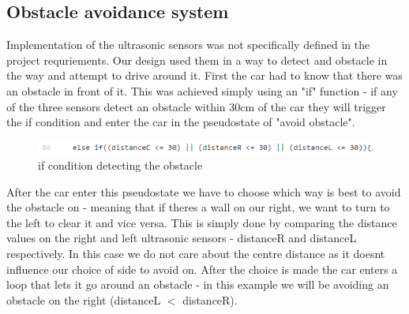 \documentclass[conference]{IEEEtran}
\begin{document}
\subsection{Obstacle avoidance system}
Implementation of the ultrasonic sensors was not specifically defined in the project requriements. Our design used them in a way to detect and obstacle in the way and attempt to drive around it. First the car had to know that there was an obstacle in front of it. This was achieved simply using an "if" function - if any of the three sensors detect an obstacle within 30cm of the car they will trigger the if condition and enter the car in the pseudostate of "avoid obstacle".
\begin{figure}[h!]
	\includegraphics[width=\linewidth]{examplecode2.png}
	\caption{if condition detecting the obstacle}
	\label{fig:EXC2}
\end{figure}
After the car enter this pseudostate we have to choose which way is best to avoid the obstacle on - meaning that if theres a wall on our right, we want to turn to the left to clear it and vice versa. This is simply done by comparing the distance values on the right and left ultrasonic sensors - distanceR and distanceL respectively. In this case we do not care about the centre distance as it doesnt influence our choice of side to avoid on. After the choice is made the car enters a loop that lets it go around an obstacle - in this example we will be avoiding an obstacle on the right (distanceL $<$ distanceR).
\end{document}
